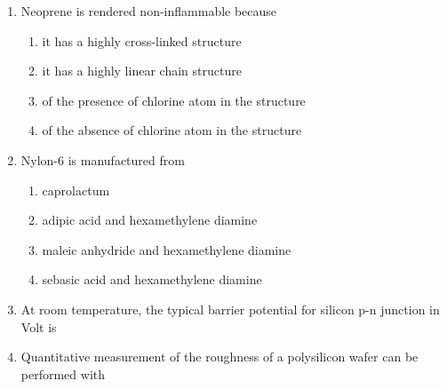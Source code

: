 \documentclass[a4paper,10pt]{article}
\begin{document}
\begin{enumerate}
    \item Neoprene is rendered non-inflammable because
    
    \hfill{}
    \begin{enumerate}
        \item it has a highly cross-linked structure
        \item it has a highly linear chain structure
        \item of the presence of chlorine atom in the structure
        \item of the absence of chlorine atom in the structure
    \end{enumerate}

    \item Nylon-6 is manufactured from
    
    \hfill{}
    \begin{enumerate}
        \item caprolactum
        \item adipic acid and hexamethylene diamine
        \item maleic anhydride and hexamethylene diamine
        \item sebasic acid and hexamethylene diamine
    \end{enumerate}

    \item At room temperature, the typical barrier potential for silicon p-n junction in Volt  is
    
    \hfill{}
    \begin{enumerate}
    \end{enumerate}

    \item Quantitative measurement of the roughness of a polysilicon wafer can be performed with
    
    \hfill{}
    \begin{enumerate}
    \end{enumerate}


\end{enumerate}
\end{document}
